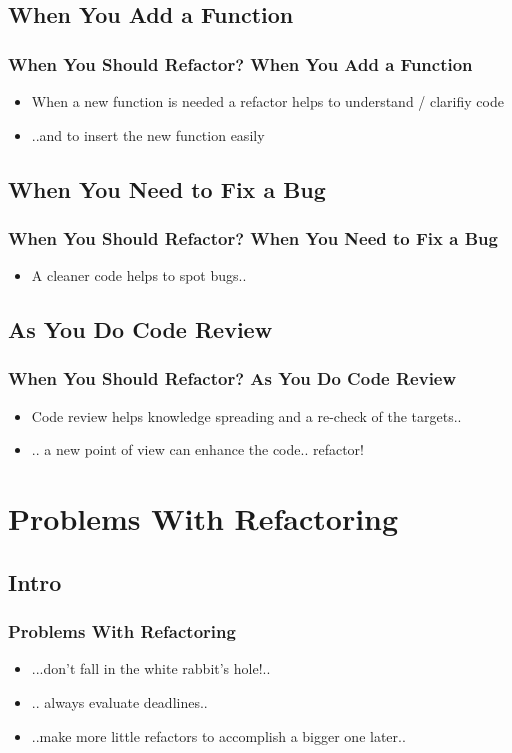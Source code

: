 \documentclass{beamer}
\begin{document}
\subsection{When You Add a Function}
\begin{frame}
  \frametitle{When You Should Refactor? When You Add a Function} 
  \begin{itemize}
  		\item<+-> When a new function is needed a refactor helps to understand / clarifiy code 
  		\item<+-> ..and to insert the new function easily
  \end{itemize}
\end{frame}  
  
\subsection{When You Need to Fix a Bug}
\begin{frame}
  \frametitle{When You Should Refactor? When You Need to Fix a Bug} 
  \begin{itemize}
  		\item<+-> A cleaner code helps to spot bugs..
  \end{itemize}
\end{frame}

\subsection{As You Do Code Review}
\begin{frame}
  \frametitle{When You Should Refactor? As You Do Code Review} 
  \begin{itemize}
  		\item<+-> Code review helps knowledge spreading and a re-check of the targets..
  		\item<+-> .. a new point of view can enhance the code.. refactor!
  \end{itemize}
\end{frame}

\section{Problems With Refactoring}
\subsection{Intro}
\begin{frame}
  \frametitle{Problems With Refactoring} 
  \begin{itemize}
  		\item<+-> ...don't fall in the white rabbit's hole!..
  		\item<+-> .. always evaluate deadlines.. 
  		\item<+-> ..make more little refactors to accomplish a bigger one later..
  \end{itemize}
\end{frame}
\end{document}
